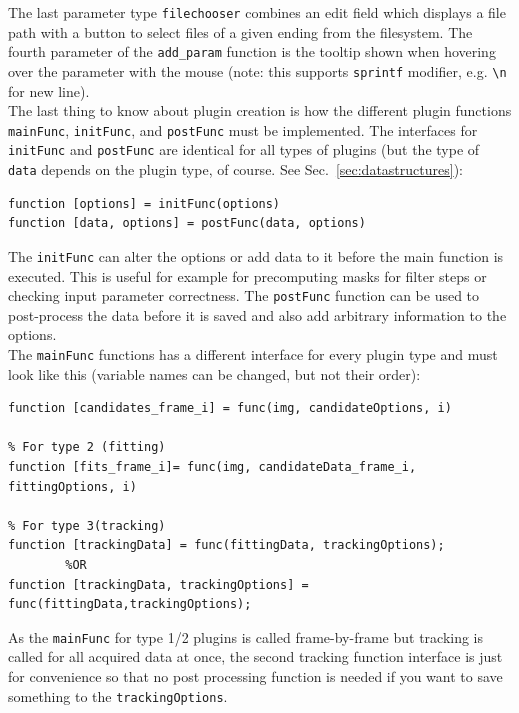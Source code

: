 \documentclass[11pt,onside]{report}
\numberwithin{equation}{chapter}
\begin{document}
The last parameter type \texttt{filechooser} combines an edit field which displays a file path with a button to select files of a given ending from the filesystem. The fourth parameter of the \texttt{add\_param} function is the tooltip shown when hovering over the parameter with the mouse (note: this supports \texttt{sprintf} modifier, e.g. \texttt{\textbackslash{}n} for new line). \\

The last thing to know about plugin creation is how the different plugin functions \texttt{mainFunc}, \texttt{initFunc}, and \texttt{postFunc} must be implemented. The interfaces for \texttt{initFunc} and \texttt{postFunc} are identical for all types of plugins (but the type of \texttt{data} depends on the plugin type, of course. See Sec.~\ref{sec:datastructures}):
\begin{lstlisting}[style=Matlab-editor]
function [options] = initFunc(options)
function [data, options] = postFunc(data, options)
\end{lstlisting}
The \texttt{initFunc} can alter the options or add data to it before the main function is executed. This is useful for example for precomputing masks for filter steps or checking input parameter correctness. The \texttt{postFunc} function can be used to post-process the data before it is saved and also add arbitrary information to the options.\\

 The \texttt{mainFunc} functions has  a different interface for every plugin type and must look like this (variable names can be changed, but not their order):
\begin{lstlisting}[style=Matlab-editor]
% For type 1 (candidate detection)
function [candidates_frame_i] = func(img, candidateOptions, i)
  
% For type 2 (fitting)
function [fits_frame_i]= func(img, candidateData_frame_i, fittingOptions, i)
  
% For type 3(tracking)
function [trackingData] = func(fittingData, trackingOptions);
        %OR
function [trackingData, trackingOptions] = func(fittingData,trackingOptions);
\end{lstlisting}
As the \texttt{mainFunc} for type 1/2 plugins is called frame-by-frame but tracking is called for all acquired data at once, the second tracking function interface is just for convenience so that no post processing function is needed if you want to save something to the \texttt{trackingOptions}. \\
\end{document}
